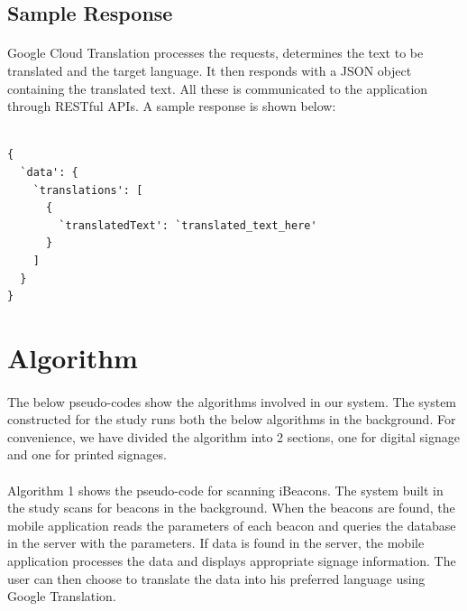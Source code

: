 \documentclass[12pt]{article}
\begin{document}
\subsection{Sample Response}

\paragraph{} Google Cloud Translation processes the requests, determines the text to be translated  and the target language. It then responds with a JSON object containing the translated text. All these is communicated to the application through RESTful APIs. A sample response is shown below:

\begin{lstlisting}

{
  `data': {
    `translations': [
      {
        `translatedText': `translated_text_here'
      }
    ]
  }
}
\end{lstlisting}



\section{Algorithm}

\paragraph{}The below pseudo-codes show the algorithms involved in our system. The system constructed for the study runs both the below algorithms in the background. For convenience, we have divided the algorithm into 2 sections, one for digital signage and one for printed signages. 


\paragraph{}Algorithm 1 shows the pseudo-code for scanning iBeacons. The system built in the study scans for beacons in the background. When the beacons are found, the mobile application reads the parameters of each beacon and queries the database in the server with the parameters. If data is found in the server, the mobile application processes the data and displays appropriate signage information. The user can then choose to translate the data into his preferred language using Google Translation.
\end{document}
